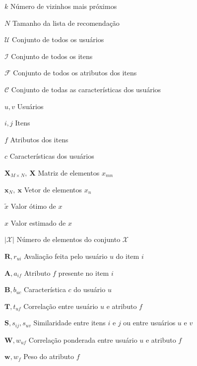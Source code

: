 \begin{simbolos}\label{simbolos}
    \item[$k$]  Número de vizinhos mais próximos 
    \item[$N$] Tamanho da lista de recomendação  
    \item[$\mathcal{U}$] Conjunto de todos os usuários 
    \item[$\mathcal{I}$] Conjunto de todos os itens  
    \item[$\mathcal{F}$] Conjunto  de todos os atributos dos itens
    \item[$\mathcal{C}$] Conjunto  de todas as características dos usuários
    \item[$u, v$] Usuários 
    \item[$i, j$] Itens 
    \item[$f$] Atributos dos itens 
    \item[$c $] Características dos usuários  
    \item[$\mathbf{X}_{M \times N},~\mathbf{X}$] Matriz de elementos $x_{mn}$ 
    \item[$\mathbf{x}_{N},~\mathbf{x}$] Vetor de elementos $x_{n}$
    \item[$\tilde{x}$] Valor ótimo de $x$
    \item[$\hat{x}$] Valor estimado de $x$
    \item[$|\mathcal{X}|$] Número de elementos do conjunto $\mathcal{X}$
    \item[$\mathbf{R}, r_{ui}$] Avaliação feita pelo usuário $u$ do item $i$
    \item[$\mathbf{A}, a_{if}$] Atributo $f$ presente no item $i$
    \item[$\mathbf{B}, b_{uc}$] Característica $c$ do usuário $u$   
    \item[$\mathbf{T}, t_{uf}$] Correlação entre usuário $u$ e atributo $f$
    \item[$\mathbf{S}, s_{ij}, s_{uv}$] Similaridade entre itens $i$ e $j$ ou entre usuários $u$ e $v$
    \item[$\mathbf{W}, w_{uf}$] Correlação ponderada entre usuário $u$ e atributo $f$ 
    \item[$\mathbf{w}, w_{f}$] Peso do atributo $f$
\end{simbolos}
